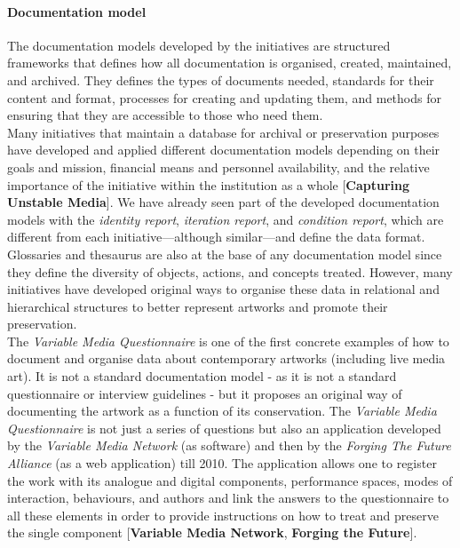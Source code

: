 \paragraph*{Documentation model}
The documentation models developed by the initiatives are structured frameworks that defines how all documentation is organised, created, maintained, and archived. They defines the types of documents needed, standards for their content and format, processes for creating and updating them, and methods for ensuring that they are accessible to those who need them.\\
Many initiatives that maintain a database for archival or preservation purposes have developed and applied different documentation models depending on their goals and mission, financial means and personnel availability, and the relative importance of the initiative within the institution as a whole [\textbf{Capturing Unstable Media}].
We have already seen part of the developed documentation models with the \textit{identity report}, \textit{iteration report}, and \textit{condition report}, which are different from each initiative—although similar—and define the data format. Glossaries and thesaurus are also at the base of any documentation model since they define the diversity of objects, actions, and concepts treated. However, many initiatives have developed original ways to organise these data in relational and hierarchical structures to better represent artworks and promote their preservation.\\
The \textit{Variable Media Questionnaire} is one of the first concrete examples of how to document and organise data about contemporary artworks (including live media art). It is not a standard documentation model - as it is not a standard questionnaire or interview guidelines - but it proposes an original way of documenting the artwork as a function of its conservation. The \textit{Variable Media Questionnaire} is not just a series of questions but also an application developed by the \textit{Variable Media Network} (as software) and then by the \textit{Forging The Future Alliance} (as a web application) till 2010. The application allows one to register the work with its analogue and digital components, performance spaces, modes of interaction, behaviours, and authors and link the answers to the questionnaire to all these elements in order to provide instructions on how to treat and preserve the single component [\textbf{Variable Media Network}, \textbf{Forging the Future}].\\   
